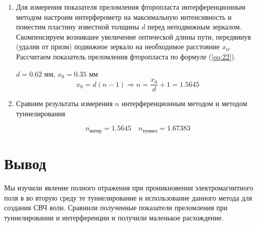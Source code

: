 \documentclass[a4paper, 12pt]{article}
\begin{document}
\begin{enumerate}
\begin{figure}[h]
			\end{figure}
		\item Для измерения показателя преломления фторопласта интерференционным методом настроим интерферометр на максимальную интенсивность и поместим пластину известной толщины $d$ перед неподвижным зеркалом. Скомпенсируем возникшее увеличение оптической длины пути, передвинув (удалив от призм) подвижное зеркало на необходимое расстояние $x_0$. Рассчитаем показатель преломления фторопласта по формуле (\ref{eq:22}).\par
		$d=0.62 \text{ мм}$, $x_0=0.35\text{ мм}$
		\begin{equation}
			x_0=d(n-1)\Rightarrow n=\frac{x_0}{d}+1=1.5645
		\end{equation}
		\item Сравним результаты измерения $n$ интерференционным методом и методом туннелирования\par
		\begin{equation}
			n_\text{интер}=1.5645\quad n_\text{туннел}=1.67383
		\end{equation}
	\end{enumerate}
	\section{Вывод}
		Мы изучили явление полного отражения при проникновении электромагнитного поля в во вторую среду те туннелирование и использование данного метода для создания СВЧ волн. Сравнили полученные показатели преломления при туннелировании и интерференции и получили маленькое расхождение.
 
\end{document}
